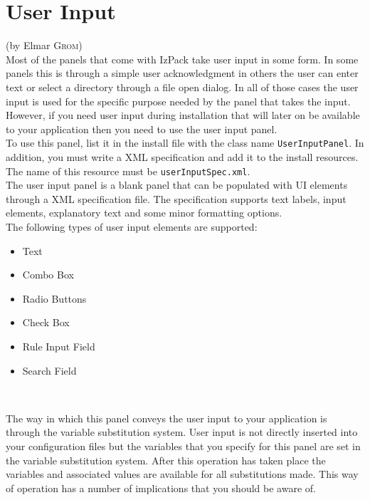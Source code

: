 

\chapter{\label{chap:userinput}User Input} (by Elmar \textsc{Grom})\\

Most of the panels that come with IzPack take user input in some form.
In some panels this is through a simple user acknowledgment in others
the user can enter text or select a directory through a file open
dialog. In all of those cases the user input is used for the specific
purpose  needed by the panel that takes the input. However, if you need
user input during installation that will later on be available  to your
application then you need to use the user input panel.\\

To use this panel, list it in the install file with the class name
\texttt{UserInputPanel}. In addition, you must write a XML specification
and add it to the install resources. The name of this resource must be
\texttt{userInputSpec.xml}.\\

The user input panel is a blank panel that can be populated with UI
elements through a XML specification file. The specification supports
text labels, input elements, explanatory text and some minor formatting
options.\\

The following types of user input elements are supported:
\begin{itemize}
\item Text
\item Combo Box
\item Radio Buttons
\item Check Box
\item Rule Input Field
\item Search Field
\end{itemize}\

The way in which this panel conveys the user input to your application
is through the variable substitution system. User input is not directly
inserted into your configuration files but the variables that you
specify for this panel are set in the variable substitution system.
After this operation has taken place the variables and associated values
are available for all substitutions made. This way of operation has a
number of implications that you should be aware of.\\

